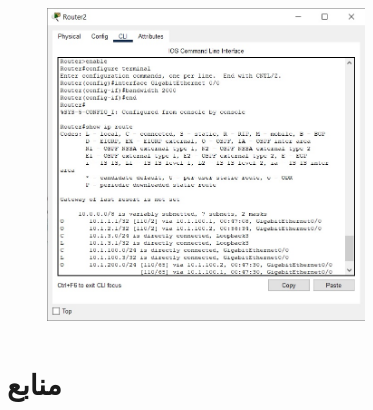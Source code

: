 \documentclass{article}
\begin{document}
\begin{figure}[H]
    \centering
    \includegraphics[width=0.75\textwidth]{figures/26.jpg}
    \caption{}
    \label{fig:fig1}
\end{figure}

\section{}%
\begin{latin}
\end{latin}
\begin{latin}
\end{latin}
\begin{latin}
\end{latin}


\section*{منابع}
\renewcommand{\section}[2]{}%
\begin{thebibliography}{99} %


\begin{LTRitems}

\resetlatinfont

\end{LTRitems}

\end{thebibliography}
\end{document}
